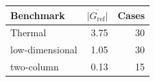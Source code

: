 \begin{tabular}{lrr}
\toprule
Benchmark & \(\overline{|G_{\mathrm{ref}}|}\) & Cases \\
\midrule
Thermal & 3.75 & 30 \\
low-dimensional & 1.05 & 30 \\
two-column & 0.13 & 15 \\
\bottomrule
\end{tabular}
